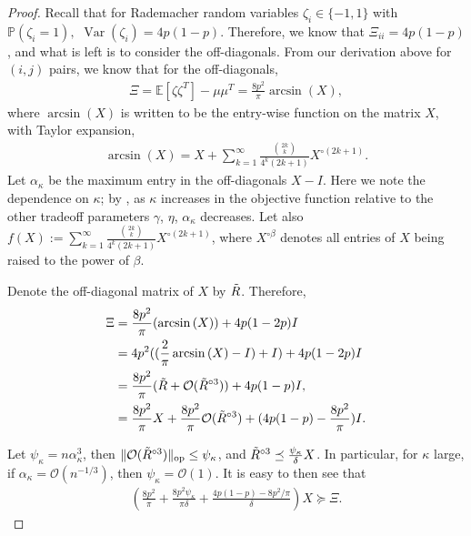 \documentclass[10pt,a4paper]{amsart}
\newcommand{\calO}{{\mathcal O}}
\newcommand{\var}{\operatorname{Var}}
\begin{document}
\begin{proof}
Recall that for Rademacher random variables $\zeta_i \in \{-1,1\}$ with $\mathbb{P}(\zeta_i = 1),$ $\var(\zeta_i) = 4p(1-p)$. Therefore, we know that $\Xi_{ii} = 4p(1-p)$, and what is left is to consider the off-diagonals. From our derivation above for $(i,j)$ pairs, we know that for the off-diagonals,
\begin{align*}
   \Xi = \mathbb{E}[\zeta \zeta^T] - \mu \mu^T = \frac{8p^2}{\pi} \arcsin{(X)}, 
\end{align*}
where $\arcsin{(X)}$ is written to be the entry-wise function on the matrix $X$, with Taylor expansion,
\begin{align*}
    \arcsin{(X)} = X + \sum_{k=1}^\infty \frac{\binom{2k}{k}}{4^k (2k + 1)} X^{\circ (2k+1)}.
\end{align*}
Let $\alpha_\kappa$ be the maximum entry in the off-diagonals $X - I$. Here we note the dependence on $\kappa$; by , as $\kappa$ increases in the objective function relative to the other tradeoff parameters $\gamma$, $\eta$, $\alpha_\kappa$ decreases. Let also $f(X):= \sum_{k=1}^\infty \frac{\binom{2k}{k}}{4^k (2k + 1)} X^{\circ (2k+1)}$, where $X^{\circ \beta}$ denotes all entries of $X$ being raised to the power of $\beta$. 

Denote the off-diagonal matrix of $X$ by $\Tilde{R}$. Therefore,
\begin{align*}
     \Xi &= \frac{8 p^2}{\pi} (\arcsin{(X)}) + 4p(1-2p)I \\
     &=  4p^2((\frac{2}{\pi}\arcsin{(X)} -I) + I) + 4p(1-2p)I \\
     &= \frac{8 p^2}{\pi} (\Tilde{R} + \calO(\Tilde{R}^{\circ 3})) + 4p(1-p)I, \\
     &= \frac{8 p^2}{\pi} X + \frac{8 p^2}{\pi} \calO(\Tilde{R}^{\circ 3})  + (4p(1-p) - \frac{8p^2}{\pi})I.
\end{align*} 

Let $\psi_\kappa = n \alpha_\kappa^{3}$, then $\| \calO(\Tilde{R}^{\circ 3})\|_{\text{op}} \leq \psi_\kappa$, and $\Tilde{R}^{\circ 3} \preceq \frac{\psi_\kappa}{\delta} X$. In particular, for $\kappa$ large, if $\alpha_\kappa = \calO(n^{-1/3})$, then $\psi_\kappa = \calO(1).$ It is easy to then see that
\begin{align*}
   \left( \frac{8p^2}{\pi}  + \frac{8p^2 \psi_\kappa}{\pi \delta} + \frac{4p(1-p) - 8p^2/\pi}{\delta}  \right)X \succeq \Xi. 
\end{align*}
\end{proof}
\end{document}
